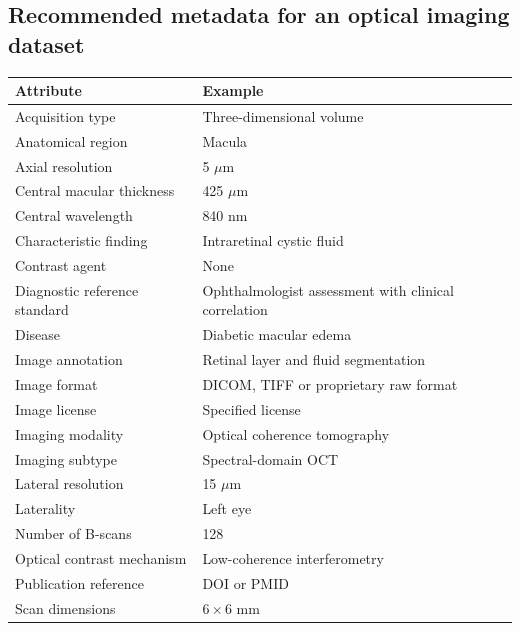 \subsection{Recommended metadata for an optical imaging dataset}
\begin{longtable}{@{}p{}p{}@{}}
\toprule
\textbf{Attribute} & \textbf{Example} \\
\midrule
Acquisition type & Three-dimensional volume \\
Anatomical region & Macula \\
Axial resolution & 5 $\mu$m \\
Central macular thickness & 425 $\mu$m \\
Central wavelength & 840 nm \\
Characteristic finding & Intraretinal cystic fluid \\
Contrast agent & None \\
Diagnostic reference standard & Ophthalmologist assessment with clinical correlation \\
Disease & Diabetic macular edema \\
Image annotation & Retinal layer and fluid segmentation \\
Image format & DICOM, TIFF or proprietary raw format \\
Image license & Specified license \\
Imaging modality & Optical coherence tomography \\
Imaging subtype & Spectral-domain OCT \\
Lateral resolution & 15 $\mu$m \\
Laterality & Left eye \\
Number of B-scans & 128 \\
Optical contrast mechanism & Low-coherence interferometry \\
Publication reference & DOI or PMID \\
Scan dimensions & $6 \times 6$ mm \\
\bottomrule
\end{longtable}

